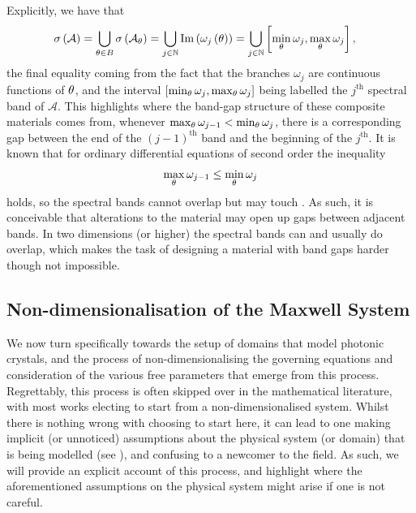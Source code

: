 Explicitly, we have that
\begin{align*}
	\sigma\left( \mathcal{A} \right) &= \bigcup_{\theta\in B} \sigma\left( \mathcal{A}_{\theta} \right)
	= \bigcup_{j\in\mathbb{N}} \mathrm{Im}\left( \omega_j\left( \theta \right) \right)
	= \bigcup_{j\in\mathbb{N}} \left[  \min_{\theta}\omega_j, \max_{\theta}\omega_j  \right],
\end{align*}
the final equality coming from the fact that the branches $\omega_j$ are continuous functions of $\theta$, and the interval $\left[  \min_{\theta}\omega_j, \max_{\theta}\omega_j  \right]$ being labelled the $j^{\text{th}}$ spectral band of $\mathcal{A}$.
This highlights where the band-gap structure of these composite materials comes from, whenever $\max_{\theta}\omega_{j-1} < \min_{\theta}\omega_{j}$, there is a corresponding gap between the end of the $(j-1)^{\text{th}}$ band and the beginning of the $j^{\text{th}}$.
It is known that for ordinary differential equations of second order the inequality 
\begin{align*}
	\max_{\theta}\omega_{j-1} \leq \min_{\theta}\omega_{j}
\end{align*}
holds, so the spectral bands cannot overlap but may touch .
As such, it is conceivable that alterations to the material may open up gaps between adjacent bands.
In two dimensions (or higher) the spectral bands can and usually do overlap, which makes the task of designing a material with band gaps harder though not impossible.

\subsection{Non-dimensionalisation of the Maxwell System} \label{ssec:Intro-NonDimMax}
We now turn specifically towards the setup of domains that model photonic crystals, and the process of non-dimensionalising the governing equations and consideration of the various free parameters that emerge from this process.
Regrettably, this process is often skipped over in the mathematical literature, with most works electing to start from a non-dimensionalised system.
Whilst there is nothing wrong with choosing to start here, it can lead to one making implicit (or unnoticed) assumptions about the physical system (or domain) that is being modelled (see ), and confusing to a newcomer to the field.
As such, we will provide an explicit account of this process, and highlight where the aforementioned assumptions on the physical system might arise if one is not careful.

